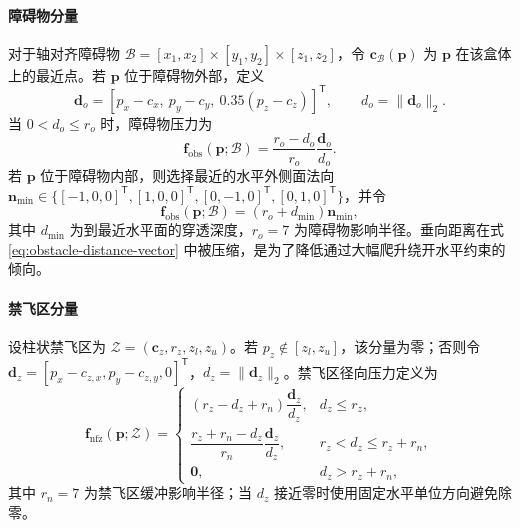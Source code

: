 \paragraph{障碍物分量}
对于轴对齐障碍物 $\mathcal B=[x_1,x_2]\times[y_1,y_2]\times[z_1,z_2]$，令 $\mathbf c_{\mathcal B}(\mathbf p)$ 为 $\mathbf p$ 在该盒体上的最近点。若 $\mathbf p$ 位于障碍物外部，定义
\begin{equation}
    \mathbf d_o=
    [p_x-c_x,\ p_y-c_y,\ 0.35(p_z-c_z)]^\mathsf T,\qquad
    d_o=\|\mathbf d_o\|_2 .
    \label{eq:obstacle-distance-vector}
\end{equation}
当 $0<d_o\leq r_o$ 时，障碍物压力为
\begin{equation}
    \mathbf f_{\mathrm{obs}}(\mathbf p;\mathcal B)=
    \frac{r_o-d_o}{r_o}\frac{\mathbf d_o}{d_o}.
    \label{eq:obstacle-buffer-pressure}
\end{equation}
若 $\mathbf p$ 位于障碍物内部，则选择最近的水平外侧面法向 $\mathbf n_{\min}\in\{[-1,0,0]^\mathsf T,[1,0,0]^\mathsf T,[0,-1,0]^\mathsf T,[0,1,0]^\mathsf T\}$，并令
\begin{equation}
    \mathbf f_{\mathrm{obs}}(\mathbf p;\mathcal B)=
    (r_o+d_{\min})\mathbf n_{\min},
    \label{eq:obstacle-inside-pressure}
\end{equation}
其中 $d_{\min}$ 为到最近水平面的穿透深度，$r_o=7$ 为障碍物影响半径。垂向距离在式 \eqref{eq:obstacle-distance-vector} 中被压缩，是为了降低通过大幅爬升绕开水平约束的倾向。

\paragraph{禁飞区分量}
设柱状禁飞区为 $\mathcal Z=(\mathbf c_z,r_z,z_l,z_u)$。若 $p_z\notin [z_l,z_u]$，该分量为零；否则令 $\mathbf d_z=[p_x-c_{z,x},p_y-c_{z,y},0]^\mathsf T$，$d_z=\|\mathbf d_z\|_2$。禁飞区径向压力定义为
\begin{equation}
    \mathbf f_{\mathrm{nfz}}(\mathbf p;\mathcal Z)=
    \begin{cases}
    (r_z-d_z+r_n)\dfrac{\mathbf d_z}{d_z}, & d_z\leq r_z,\\[6pt]
    \dfrac{r_z+r_n-d_z}{r_n}\dfrac{\mathbf d_z}{d_z}, & r_z<d_z\leq r_z+r_n,\\[6pt]
    \mathbf 0, & d_z>r_z+r_n,
    \end{cases}
    \label{eq:nfz-pressure}
\end{equation}
其中 $r_n=7$ 为禁飞区缓冲影响半径；当 $d_z$ 接近零时使用固定水平单位方向避免除零。

